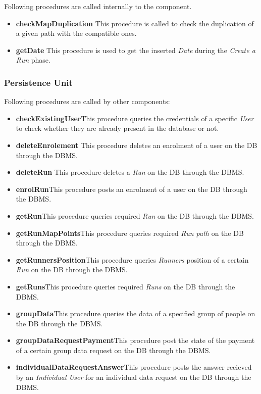 \myparagraph{}
Following procedures are called internally to the component.
\begin{itemize}
  \item \textbf{checkMapDuplication} \quad This procedure is called to check the duplication of a given path with the compatible ones.
  \item \textbf{getDate} \quad This procedure is used to get the inserted \textit{Date} during the \textit{Create a Run} phase.
\end{itemize}

\subsubsection{Persistence Unit}
Following procedures are called by other components:
\begin{itemize}
  \item \textbf{checkExistingUser}\quad This procedure queries the credentials of a specific \textit{User} to check whether they are already present in the database or not.
  \item \textbf{deleteEnrolement} \quad This procedure deletes an enrolment of a user on the DB through the DBMS.
  \item \textbf{deleteRun} \quad This procedure deletes a \textit{Run} on the DB through the DBMS.
  \item \textbf{enrolRun}\quad This procedure posts an enrolment of a user on the DB through the DBMS.
  \item \textbf{getRun}\quad This procedure queries required \textit{Run} on the DB through the DBMS.
  \item \textbf{getRunMapPoints}\quad This procedure queries required \textit{Run path} on the DB through the DBMS.
  \item \textbf{getRunnersPosition}\quad This procedure queries \textit{Runners} position of a certain \textit{Run} on the DB through the DBMS.
  \item \textbf{getRuns}\quad This procedure queries required \textit{Runs} on the DB through the DBMS.
  \item \textbf{groupData}\quad This procedure queries the data of a specified group of people on the DB through the DBMS.
  \item \textbf{groupDataRequestPayment}\quad This procedure post the state of the payment of a certain group data request on the DB through the DBMS.
  \item \textbf{individualDataRequestAnswer}\quad This procedure posts the answer recieved by an \textit{Individual User} for an individual data request on the DB through the DBMS.

\end{itemize}
